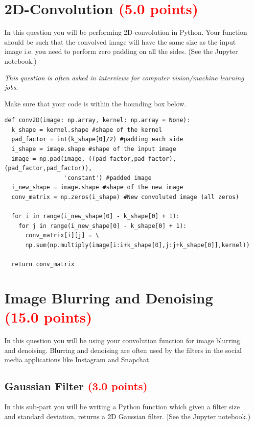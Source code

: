 \documentclass[answers]{exam}
\newcommand{\mypoints}[1]{\textcolor{red}{(#1 points)}}
\begin{document}
\section{2D-Convolution \mypoints{5.0}} 

In this question you will be performing 2D convolution in Python. Your function should be such that the convolved image will have the same size as the input image i.e. you need to perform zero padding on all the sides. 
(See the Jupyter notebook.)

\textit{This question is often asked in interviews for computer vision/machine learning jobs.}

Make sure that your code is within the bounding box below.
\begin{solution}
\begin{verbatim}
def conv2D(image: np.array, kernel: np.array = None):
  k_shape = kernel.shape #shape of the kernel
  pad_factor = int(k_shape[0]/2) #padding each side
  i_shape = image.shape #shape of the input image
  image = np.pad(image, ((pad_factor,pad_factor),(pad_factor,pad_factor)), 
                 'constant') #padded image
  i_new_shape = image.shape #shape of the new image
  conv_matrix = np.zeros(i_shape) #New convoluted image (all zeros)
  
  for i in range(i_new_shape[0] - k_shape[0] + 1):
    for j in range(i_new_shape[0] - k_shape[0] + 1):
      conv_matrix[i][j] = \
      np.sum(np.multiply(image[i:i+k_shape[0],j:j+k_shape[0]],kernel))
      
  return conv_matrix
\end{verbatim}
\end{solution}

\newpage
\section{Image Blurring and Denoising \mypoints{15.0}}
In this question you will be using your convolution function for image blurring and denoising. Blurring and denoising are often used by the filters in the social media applications like Instagram and Snapchat. 

\subsection{Gaussian Filter \mypoints{3.0}}
In this sub-part you will be writing a Python function which given a filter size and standard deviation, returns a 2D Gaussian filter. (See the Jupyter notebook.)
\end{document}
